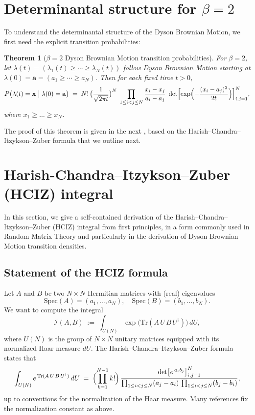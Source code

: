 \documentclass[letterpaper,11pt,oneside,reqno]{book}
\numberwithin{equation}{chapter}  %
\newtheorem{theorem}[proposition]{Theorem}
\theoremstyle{definition}
\begin{document}
\section{Determinantal structure for $\beta=2$}

To understand the determinantal structure of the Dyson Brownian Motion, we
first need the explicit transition probabilities:

\begin{theorem}[\(\beta=2\) Dyson Brownian Motion transition probabilities]
	\label{lecture10:thm:dbm-transition}
For \(\beta=2\), let \(\lambda(t)=(\lambda_1(t)\ge \cdots \ge \lambda_N(t))\) follow Dyson Brownian Motion starting at \(\lambda(0)=\mathbf{a}=(a_1\ge \cdots \ge a_N)\).  Then for each fixed time \(t>0\),
\[
P\bigl(\lambda(t) = \mathbf{x}\;\big|\;\lambda(0)=\mathbf{a}\bigr)
\;=\;
N!\,\bigl(\frac{1}{\sqrt{2\pi t}}\bigr)^{N}
\;\prod_{1\le i<j\le N}\frac{x_i - x_j}{a_i - a_j}
\;\det\Bigl[\exp\Bigl(-\frac{(x_i - a_j)^2}{2t}\Bigr)\Bigr]_{i,j=1}^N,
\]
where \(x_1 \ge \dots \ge x_N\).
\end{theorem}

The proof of this theorem is given in the next
,
based on the Harish--Chandra--Itzykson--Zuber formula that we
outline next.


\section{Harish-Chandra--Itzykson--Zuber (HCIZ) integral}

In this section, we give a self-contained derivation of the Harish--Chandra--Itzykson--Zuber (HCIZ) integral from first principles, in a form commonly used in Random Matrix Theory and particularly in the derivation of Dyson Brownian Motion transition densities.

\subsection{Statement of the HCIZ formula}

Let \(A\) and \(B\) be two \(N\times N\) Hermitian matrices with (real) eigenvalues
\[
   \mathrm{Spec}(A) = (a_1,\dots,a_N),
   \quad
   \mathrm{Spec}(B) = (b_1,\dots,b_N).
\]
We want to compute the integral
\[
   \mathcal{I}(A,B)
   \;:=\;
   \int_{U(N)}
   \exp\bigl(\mathrm{Tr}(A\,U\,B\,U^\dagger)\bigr)
   \,dU,
\]
where \(U(N)\) is the group of \(N\times N\) unitary matrices equipped with its normalized Haar measure \(dU\).
The Harish--Chandra--Itzykson--Zuber formula states that
\[
   \int_{U(N)}
   e^{\,\mathrm{Tr}(A\,U\,B\,U^\dagger)}
   \,dU
   \;=\;
   \Bigl(\prod_{k=1}^{N-1} k!\Bigr)\,
   \frac{\det\bigl[e^{\,a_i b_j}\bigr]_{i,j=1}^N}{\prod_{1\le i<j\le N}(a_j-a_i)\,\prod_{1\le i<j\le N}(b_j-b_i)},
\]
up to conventions for the normalization of the Haar measure. Many references fix
the normalization constant
as above.
\end{document}
